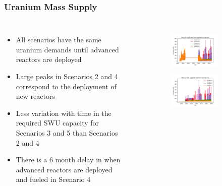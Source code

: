 \begin{frame}
    \frametitle{Uranium Mass Supply}
    \begin{columns}
        \column[t]{5cm}
            \begin{itemize}
                \item All scenarios have the same uranium demands until 
                      advanced reactors are deployed
                \item Large peaks in Scenarios 2 and 4 correspond to the 
                      deployment of new reactors
                \item Less variation with time in the required \gls{SWU} capacity 
                      for Scenarios 3 and 5 than Scenarios 2 and 4
                \item There is a 6 month delay in when advanced reactors 
                      are deployed and fueled in Scenario 4
            \end{itemize}
        \column[t]{5cm}
        \vspace{-0.8cm}
        \begin{figure}
            \centering 
            \begin{subfigure}
                \centering
                \includegraphics[scale=0.3]{figures/fuelsupply_scenarios_all.png}
                \label{fig:fuel_all}
            \end{subfigure}
            \begin{subfigure}
                \centering
                \includegraphics[scale=0.3]{figures/advancedRX_fuelsupply_scenarios_2-5.png}

\end{subfigure}
\end{figure}
\end{columns}
\end{frame}
